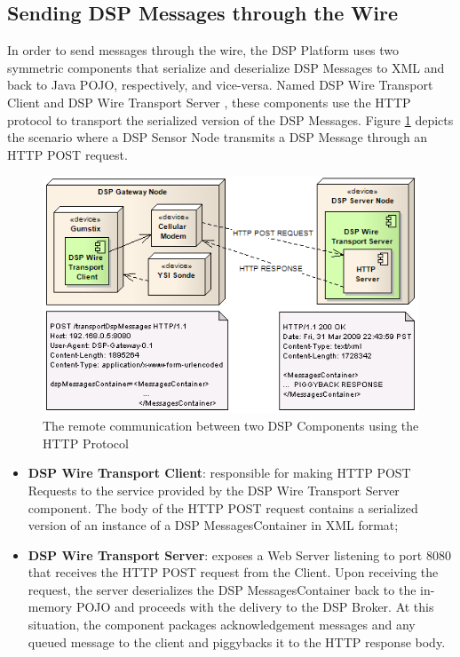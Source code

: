 \subsection{Sending DSP Messages through the Wire}

In order to send messages through the wire, the DSP Platform uses two symmetric
components that serialize and deserialize DSP Messages to XML and back to Java
POJO, respectively, and vice-versa. Named DSP Wire Transport Client and DSP
Wire Transport Server \cite{netbeams2009}, these components use the HTTP
\cite{http} protocol to transport the serialized version of the DSP Messages.
Figure \ref{fig:DSP-to-DSP-Remote-Communication} depicts the scenario where a
DSP Sensor Node transmits a DSP Message through an HTTP POST request.

\begin{figure}[!b]
  \centering
  \includegraphics[scale=0.6]{../diagrams/DSP-to-DSP-Remote-Communication}
  \caption{The remote communication between two DSP Components using the HTTP
  Protocol}
  \label{fig:DSP-to-DSP-Remote-Communication}
\end{figure}

\begin{itemize}
  \item \textbf{DSP Wire Transport Client}: responsible for making HTTP POST
  Requests to the service provided by the DSP Wire Transport Server component.
  The body of the HTTP POST request contains a serialized version of an
  instance of a DSP MessagesContainer in XML format;
  \item \textbf{DSP Wire Transport Server}: exposes a Web Server listening to
  port 8080 that receives the HTTP POST request from the Client. Upon receiving
  the request, the server deserializes the DSP MessagesContainer back to the
  in-memory POJO and proceeds with the delivery to the DSP Broker. At this
  situation, the component packages acknowledgement messages and any queued
  message to the client and piggybacks \cite{xml-piggybacking} it to the HTTP
  response body.
\end{itemize}

